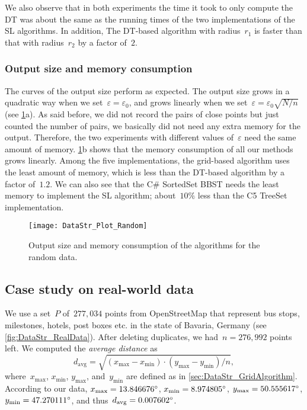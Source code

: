 We also observe that in both experiments the time it took to 
only 
compute the DT was about the same as the running times of the 
two 
implementations of the SL algorithms. In addition, The DT-based 
algorithm with radius~$r_{1}$ is faster than 
that with radius~$r_{2}$ by a factor of~$2$.



\subsubsection{Output size and memory consumption}
The curves of the output size perform as expected. 
The output size grows in a quadratic way
when we set~$\varepsilon =\varepsilon _{0}$, 
and grows linearly 
when we set~$\varepsilon =\varepsilon_{0}\sqrt{N/n}$ 
(see \fig\ref{fig:DataStr_RandomMemory}a). 
As said before, we did not record the pairs of close points 
but just counted the number of pairs, 
we basically did not need any extra memory for the output.
Therefore, the two experiments with 
different values of~$\varepsilon$ need the same amount of 
memory. 
\fig\ref{fig:DataStr_RandomMemory}b shows that the memory 
consumption of all our 
methods grows 
linearly. Among the five implementations, the grid-based 
algorithm uses 
the least amount of memory, which is less than the DT-based 
algorithm by 
a factor of~$1.2$. 
We can also see that the C\# SortedSet BBST needs 
the least memory to implement the SL algorithm; 
about~$10\%$ less than the C5 TreeSet implementation. 

\begin{figure}[tb]	
	\centering
	\texttt{[image: DataStr\_Plot\_Random]}
	\caption{Output size and memory consumption of the 
		algorithms for the random data.}
	\label{fig:DataStr_RandomMemory}
\end{figure}

\subsection{Case study on real-world data}
\label{sec:DataStr_CaseStudy_RealData} 
We use a set~$P$ of~$277{,}034$ points from OpenStreetMap that 
represent bus stops, milestones, hotels, post boxes etc. in the 
state of Bavaria, Germany (see \fig\ref{fig:DataStr_RealData}). 
After deleting duplicates, we had~$n=276{,}992 $ points left. 
We computed the \emph{average distance} as
$$
d_\mathrm{avg}=\sqrt{(x_\mathrm{max}-x_\mathrm{min})\cdot 
(y_\mathrm{max}-y_\mathrm{min})/n},
$$
where~$x_\mathrm{max}$, $x_\mathrm{min}$, $y_\mathrm{max}$, 
and~$y_\mathrm{min}$ are defined as in 
\sect\ref{sec:DataStr_GridAlgorithm}.
According to our data, 
$x_\mathrm{max}=13.846676 \degree$, 
$x_\mathrm{min}=8.974805 \degree$, 
$y_\mathrm{max}=50.555617 \degree$,
$y_\mathrm{min}=47.270111 \degree$, 
and thus~$d_\mathrm{avg}=0.007602 \degree$.


